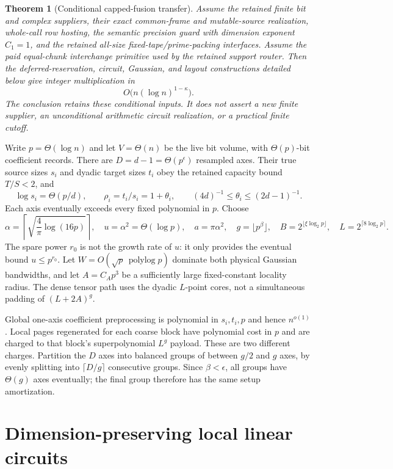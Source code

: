\documentclass[11pt]{article}
\newtheorem{theorem}{Theorem}
\newcommand{\plog}{\operatorname{polylog}}
\begin{document}
\begin{theorem}[Conditional capped-fusion transfer]\label{thm:main}
Assume the retained finite bit and complex suppliers, their exact common-frame and mutable-source realization, whole-call row hosting, the semantic precision guard with dimension exponent $C_1=1$, and the retained all-size fixed-tape/prime-packing interfaces. Assume the paid equal-chunk interchange primitive used by the retained support router. Then the deferred-reservation, circuit, Gaussian, and layout constructions detailed below give integer multiplication in
\[
 O\bigl(n(\log n)^{1-\kappa}\bigr).
\]
The conclusion retains these conditional inputs. It does not assert a new finite supplier, an unconditional arithmetic circuit realization, or a practical finite cutoff.
\end{theorem}

Write $p=\Theta(\log n)$ and let $V=\Theta(n)$ be the live bit volume, with $\Theta(p)$-bit coefficient records. There are $D=d-1=\Theta(p^\epsilon)$ resampled axes. Their true source sizes $s_i$ and dyadic target sizes $t_i$ obey the retained capacity bound $T/S<2$, and
\[
 \log s_i=\Theta(p/d),\qquad
 \rho_i=t_i/s_i=1+\theta_i,\qquad
 (4d)^{-1}\leq\theta_i\leq(2d-1)^{-1}.
\]
Each axis eventually exceeds every fixed polynomial in $p$. Choose
\[
 \alpha=\left\lceil\sqrt{\frac4\pi\log(16p)}\right\rceil,
 \quad u=\alpha^2=\Theta(\log p),\quad a=\pi\alpha^2,
 \quad g=\lfloor p^\beta\rfloor,
 \quad B=2^{\lfloor\xi\log_2p\rfloor},
 \quad L=2^{\lceil8\log_2p\rceil}.
\]
The spare power $r_0$ is not the growth rate of $u$: it only provides the eventual bound $u\leq p^{r_0}$. Let $W=O(\sqrt p\,\plog p)$ dominate both physical Gaussian bandwidths, and let $A=C_Ap^3$ be a sufficiently large fixed-constant locality radius. The dense tensor path uses the dyadic $L$-point cores, not a simultaneous padding of $(L+2A)^g$.

Global one-axis coefficient preprocessing is polynomial in $s_i,t_i,p$ and hence $n^{o(1)}$. Local pages regenerated for each coarse block have polynomial cost in $p$ and are charged to that block's superpolynomial $L^g$ payload. These are two different charges. Partition the $D$ axes into balanced groups of between $g/2$ and $g$ axes, by evenly splitting into $\lceil D/g\rceil$ consecutive groups. Since $\beta<\epsilon$, all groups have $\Theta(g)$ axes eventually; the final group therefore has the same setup amortization.

\section{Dimension-preserving local linear circuits}
\end{document}
